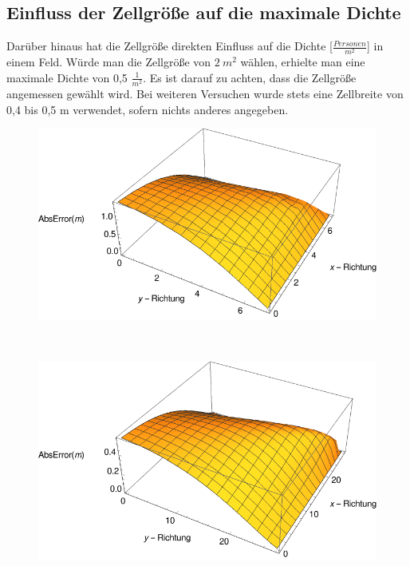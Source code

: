 \subsection{Einfluss der Zellgröße auf die maximale Dichte}
Darüber hinaus hat die Zellgröße direkten Einfluss auf die Dichte [$\frac{Personen}{m^2}$] in einem Feld. Würde man die Zellgröße von $2\ m^2$ wählen, erhielte man eine maximale Dichte von 0,5 $\frac{1}{m^2}$. Es ist darauf zu achten, dass die Zellgröße angemessen gewählt wird. Bei weiteren Versuchen wurde stets eine Zellbreite von 0,4 bis 0,5 m verwendet, sofern nichts anderes angegeben.



\begin{figure}
\centering
\begin{minipage}{.8\textwidth}
\centering
  \includegraphics[width=1\linewidth]{abbildungen/vergleich_euklid_fast_marching/3DVergleich/cellsize2/Error.pdf}
\end{minipage}%
\\
\begin{minipage}{.8\textwidth}
\centering
  \includegraphics[width=1\linewidth]{abbildungen/vergleich_euklid_fast_marching/3DVergleich/cellsize0_5/Error.pdf}

\end{minipage}
\end{figure}
